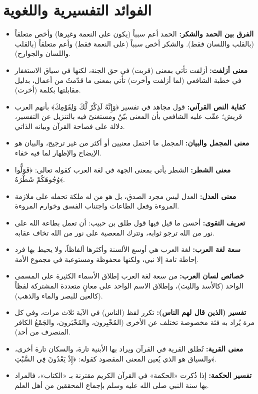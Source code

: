 \section{الفوائد التفسيرية واللغوية}
\begin{itemize}
    \item \textbf{الفرق بين الحمد والشكر:} الحمد أعم سبباً (يكون على النعمة وغيرها) وأخص متعلقاً (بالقلب واللسان فقط). والشكر أخص سبباً (على النعمة فقط) وأعم متعلقاً (بالقلب واللسان والجوارح).
    \item \textbf{معنى أزلفت:} أزلفت تأتي بمعنى (قربت) في حق الجنة، لكنها في سياق الاستغفار في خطبة الشافعي (لما أزلفت وأخرت) تأتي بمعنى ما قدّمتُ من أعمال، بدليل مقابلتها بكلمة (أخرت).
    \item \textbf{كفاية النص القرآني:} قول مجاهد في تفسير ﴿وَإِنَّهُ لَذِكْرٌ لَّكَ وَلِقَوْمِكَ﴾ بأنهم العرب قريش؛ عقّب عليه الشافعي بأن المعنى بيّنٌ ومستغنىً فيه بالتنزيل عن التفسير، دلالة على فصاحة القرآن وبيانه الذاتي.
    \item \textbf{معنى المجمل والبيان:} المجمل ما احتمل معنيين أو أكثر من غير ترجيح، والبيان هو الإيضاح والإظهار لما فيه خفاء.
    \item \textbf{معنى الشطر:} الشطر يأتي بمعنى الجهة في لغة العرب كقوله تعالى: ﴿فَوَلُّوا وُجُوهَكُمْ شَطْرَهُ﴾.
    \item \textbf{معنى العدل:} العدل ليس مجرد الصدق، بل هو من له ملكة تحمله على ملازمة المروءة وفعل الطاعات واجتناب الفسق وخوارم المروءة.
    \item \textbf{تعريف التقوى:} أحسن ما قيل فيها قول طلق بن حبيب: أن تعمل بطاعة الله على نور من الله ترجو ثوابه، وتترك المعصية على نور من الله تخاف عقابه.
    \item \textbf{سعة لغة العرب:} لغة العرب هي أوسع الألسنة وأكثرها ألفاظاً، ولا يحيط بها فرد إحاطة تامة إلا نبي، ولكنها محفوظة ومستوعبة في مجموع الأمة.
    \item \textbf{خصائص لسان العرب:} من سعة لغة العرب إطلاق الأسماء الكثيرة على المسمى الواحد (كالأسد والليث)، وإطلاق الاسم الواحد على معانٍ متعددة المشتركة لفظاً (كالعين للبصر والماء والذهب).
    \item \textbf{تفسير (الذين قال لهم الناس):} تكرر لفظ (الناس) في الآية ثلاث مرات، وفي كل مرة يُراد به فئة مخصوصة تختلف عن الأخرى (المُخْبِرون، والمُخْبَرون، والجَمْعُ الكافر المنصرف من أحد).
    \item \textbf{معنى القرية:} تُطلق القرية في القرآن ويراد بها الأبنية تارة، والسكان تارة أخرى، والسياق هو الذي يُعين المعنى المقصود كقوله: ﴿إِذْ يَعْدُونَ فِي السَّبْتِ﴾.
    \item \textbf{تفسير الحكمة:} إذا ذُكرت «الحكمة» في القرآن الكريم مقترنة بـ «الكتاب»، فالمراد بها سنة النبي صلى الله عليه وسلم بإجماع المحققين من أهل العلم.

\end{itemize}

